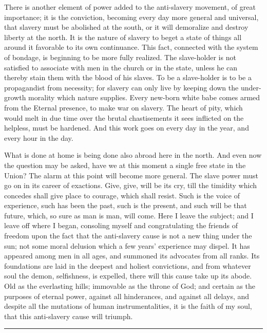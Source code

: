 There is another element of power added to the anti-slavery movement, of
great importance; it is the conviction, becoming every day more general
and universal, that slavery must be abolished at the south, or it will
demoralize and destroy liberty at the north. It is the nature of slavery
to beget a state of things all around it favorable to its own
continuance. This fact, connected with the system of bondage, is
beginning to be more fully realized. The slave-holder is not satisfied
to associate with men in the church or in the state, unless he can
thereby stain them with the blood of his slaves. To be a slave-holder is
to be a propagandist from necessity; for slavery can only live by
keeping down the under-growth morality which nature supplies. Every
new-born white babe comes armed from the Eternal presence, to make war
on slavery. The heart of pity, which would melt in due time over the
brutal chastisements it sees inflicted on the helpless, must be
hardened. And this work goes on every day in the year, and every hour in
the day.

What is done at home is being done also abroad here in the north. And
even now the question may be asked, have we at this moment a single free
state in the Union? The alarm at this point will become more general.
The slave power must go on in its career of exactions. Give, give, will
be its cry, till the timidity which concedes shall give place to
courage, which shall resist. Such is the voice of experience, such has
been the past, such is the present, and such will be that future, which,
so sure as man is man, will come. Here I leave the subject; and I leave
off where I began, consoling myself and congratulating the friends of
freedom upon the fact that the anti-slavery cause is not a new thing
under the sun; not some moral delusion which a few years' experience may
dispel. It has appeared among men in all ages, and summoned its
advocates from all ranks. Its foundations are laid in the deepest and
holiest convictions, and from whatever soul the demon, selfishness, is
expelled, there will this cause take up its abode. Old as the
everlasting hills; immovable as the throne of God; and certain as the
purposes of eternal power, against all hinderances, and against all
delays, and despite all the mutations of human instrumentalities, it is
the faith of my soul, that this anti-slavery cause will triumph.

\begin{center}\rule{0.5\linewidth}{\linethickness}\end{center}

